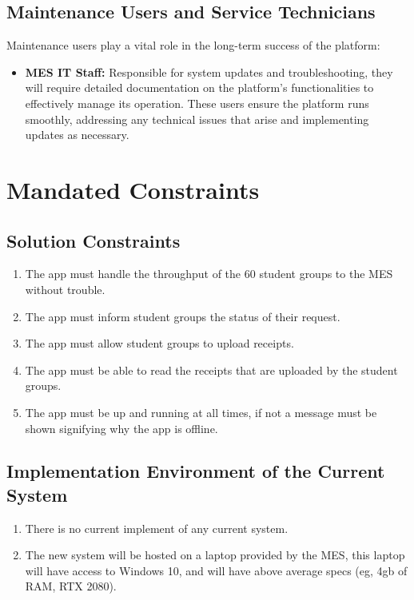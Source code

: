 \documentclass[12pt]{article}
\begin{document}
\subsection{Maintenance Users and Service Technicians}
Maintenance users play a vital role in the long-term success of the platform:
\begin{itemize}
    \item \textbf{MES IT Staff:} Responsible for system updates and troubleshooting, they will require detailed documentation on the platform's functionalities to effectively manage its operation. These users ensure the platform runs smoothly, addressing any technical issues that arise and implementing updates as necessary.
\end{itemize}




\section{Mandated Constraints}
\subsection{Solution Constraints}
\begin{enumerate}
  \item The app must handle the throughput of the 60 student groups to the MES without trouble.
  \item The app must inform student groups the status of their request. 
  \item The app must allow student groups to upload receipts. 
  \item The app must be able to read the receipts that are uploaded by the student groups. 
  \item The app must be up and running at all times, if not a message must be shown signifying why the app is offline. 
\end{enumerate}
\subsection{Implementation Environment of the Current System}
\begin{enumerate}
  \item There is no current implement of any current system.
  \item The new system will be hosted on a laptop provided by the MES, this laptop will have access to Windows 10, and will have above average specs (eg, 4gb of RAM, RTX 2080).
\end{enumerate}
\end{document}
